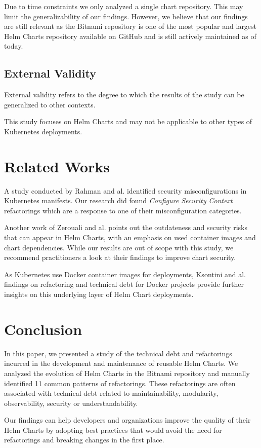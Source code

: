 \documentclass[conference]{IEEEtran}
\begin{document}
Due to time constraints we only analyzed a single chart repository. This may limit the generalizability of our findings. However, we believe that our findings are still relevant as the Bitnami repository is one of the most popular and largest Helm Charts repository available on GitHub and is still actively maintained as of today.

\subsection{External Validity}

External validity refers to the degree to which the results of the study can be generalized to other contexts.

This study focuses on Helm Charts and may not be applicable to other types of Kubernetes deployments.

\section{Related Works}

A study conducted by Rahman and al. \cite{rahman2023security} identified security misconfigurations in Kubernetes manifests. Our research did found \textit{Configure Security Context} refactorings which are a response to one of their misconfiguration categories.

Another work of Zerouali and al. \cite{zerouali2022helm} points out the outdateness and security risks that can appear in Helm Charts, with an emphasis on used container images and chart dependencies. While our results are out of scope with this study, we recommend practitioners a look at their findings to improve chart security.

As Kubernetes use Docker container images for deployments, Ksontini and al. \cite{kessentini2021refactorings} findings on refactoring and technical debt for Docker projects provide further insights on this underlying layer of Helm Chart deployments.

\section{Conclusion}

In this paper, we presented a study of the technical debt and refactorings incurred in the development and maintenance of reusable Helm Charts. We analyzed the evolution of Helm Charts in the Bitnami repository and manually identified 11 common patterns of refactorings. These refactorings are often associated with technical debt related to maintainability, modularity, observability, security or understandability.

Our findings can help developers and organizations improve the quality of their Helm Charts by adopting best practices that would avoid the need for refactorings and breaking changes in the first place.



\end{document}
